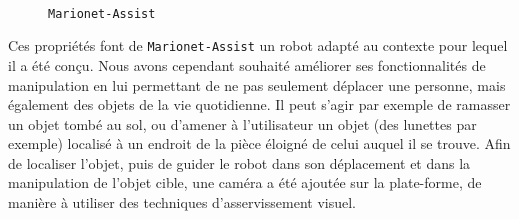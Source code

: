 \begin{figure}[htp]
  \centering
 \hfill
\\
\hfill
    \caption{\footnotesize{{\tt Marionet-Assist}}}
\label{intro:fig10}
\end{figure}

Ces propriétés font de {\tt Marionet-Assist} un robot adapté au contexte pour 
lequel il a été conçu. Nous avons cependant souhaité améliorer ses 
fonctionnalités de manipulation en lui permettant de ne pas seulement déplacer 
une personne, mais également des objets de la vie quotidienne. Il peut s'agir 
par exemple de ramasser un objet tombé au sol, ou d'amener à l'utilisateur un 
objet (des lunettes par exemple) localisé à un endroit de la pièce éloigné de 
celui auquel il se trouve. Afin de localiser l'objet, puis de guider le robot 
dans son déplacement et dans la manipulation de l'objet cible, une caméra a été 
ajoutée sur la plate-forme, de manière à utiliser des techniques 
d'asservissement visuel.

